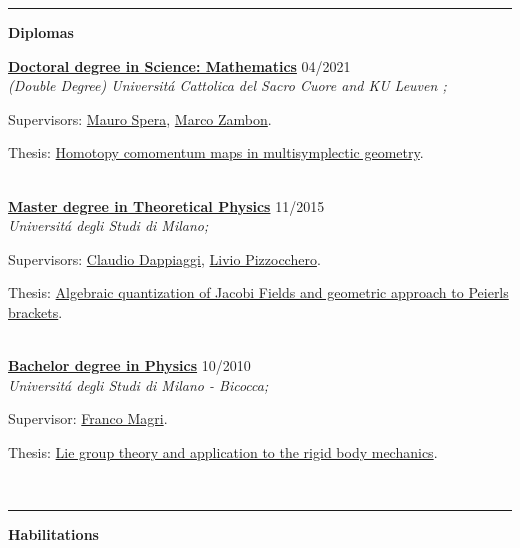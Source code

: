 \documentclass[a4paper]{article}
\newcommand{\block}[1]{\hrule \vspace{0.2cm} \textbf{\Large #1} \vspace{0.2cm}}
\newcommand{\voice}[5]{\href{#4}{\textbf{#1}} \hfill #2 \\ \textit{#3} \\ {\small #5} \vspace{0.2cm} \\}
\begin{document}


    \block{Diplomas}

    
    \voice{Doctoral degree in Science: Mathematics}
        {04/2021}
        {(Double Degree) Universit\'a Cattolica del Sacro Cuore and KU Leuven ;}
        {https://web.archive.org/save/http://scuoledidottorato.unicatt.it/phdschools/science-research-projects}       
        {Supervisors: \href{http://docenti.unicatt.it/ita/mauro_spera/}{Mauro Spera}, \href{https://perswww.kuleuven.be/~u0096206/}{Marco Zambon}. \par Thesis: \href{https://limo.libis.be/primo-explore/fulldisplay?docid=LIRIAS3408626&context=L&vid=KULeuven&search_scope=ALL_CONTENT&tab=all_content_tab&lang=en_US}{Homotopy comomentum maps in multisymplectic geometry}.}
    \voice{Master degree in Theoretical Physics}
        {11/2015}
        {Universit\'a degli Studi di Milano;}
        {https://fisica-lm.cdl.unimi.it/it}       
        {Supervisors: \href{http://fisica.unipv.it/personale/Persona.php?ID=256}{Claudio Dappiaggi}, \href{http://users.mat.unimi.it/users/pizzocchero/}{Livio Pizzocchero}. \par Thesis: \href{https://www.researchgate.net/publication/295548746_Algebraic_quantization_of_Jacobi_fields_and_geometric_approach_to_Peierls_brackets}{Algebraic quantization of Jacobi Fields and geometric approach to Peierls brackets}.}
    \voice{Bachelor degree in Physics}
        {10/2010}
        {Universit\'a degli Studi di Milano - Bicocca;}
        {https://www.fisica.unimib.it/en}       
        {Supervisor: \href{http://staff.matapp.unimib.it/~/magri/}{Franco Magri}. \par Thesis: \href{https://github.com/MasterToninus/TesiTriennale/blob/master/tesi.pdf}{Lie group theory and application to the rigid body mechanics}.}





    \block{Habilitations}
\end{document}
